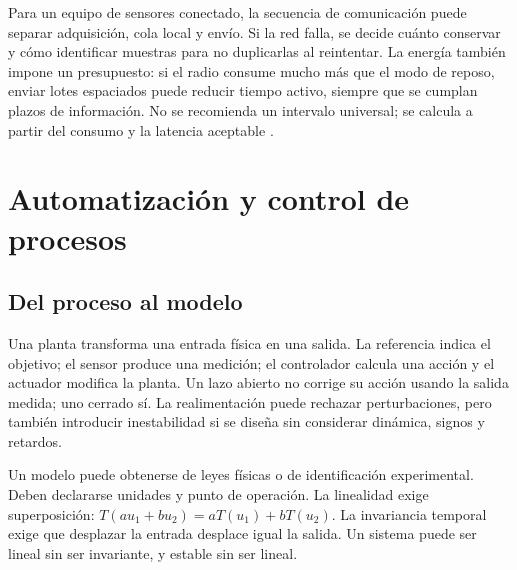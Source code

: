 Para un equipo de sensores conectado, la secuencia de comunicación puede separar adquisición, cola local y envío. Si la red falla, se decide cuánto conservar y cómo identificar muestras para no duplicarlas al reintentar. La energía también impone un presupuesto: si el radio consume mucho más que el modo de reposo, enviar lotes espaciados puede reducir tiempo activo, siempre que se cumplan plazos de información. No se recomienda un intervalo universal; se calcula a partir del consumo y la latencia aceptable \cite{avr,sensors,nistsecurity}.


\section{Automatización y control de procesos}\label{sec:h4}
\subsection{Del proceso al modelo}
Una planta transforma una entrada física en una salida. La referencia indica el objetivo; el sensor produce una medición; el controlador calcula una acción y el actuador modifica la planta. Un lazo abierto no corrige su acción usando la salida medida; uno cerrado sí. La realimentación puede rechazar perturbaciones, pero también introducir inestabilidad si se diseña sin considerar dinámica, signos y retardos.
\begin{center}
\end{center}
Un modelo puede obtenerse de leyes físicas o de identificación experimental. Deben declararse unidades y punto de operación. La linealidad exige superposición: $T(au_1+bu_2)=aT(u_1)+bT(u_2)$. La invariancia temporal exige que desplazar la entrada desplace igual la salida. Un sistema puede ser lineal sin ser invariante, y estable sin ser lineal.


